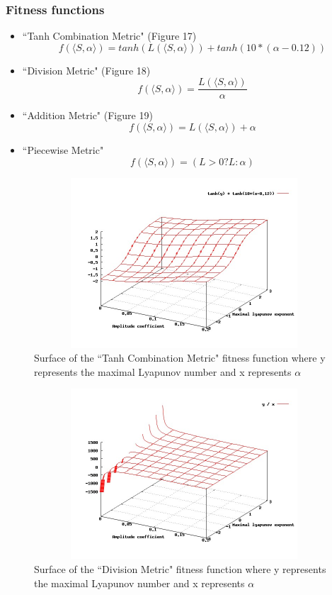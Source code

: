 \documentclass[12pt]{article}
\begin{document}
\subsubsection{Fitness functions}
\begin{itemize}
\item ``Tanh Combination Metric" (Figure 17) $$f(\langle S,\alpha \rangle) = tanh( L( \langle S, \alpha \rangle ) ) + tanh( 10*(\alpha - 0.12) )$$
\item ``Division Metric" (Figure 18) $$f(\langle S, \alpha \rangle) = \frac{L( \langle S, \alpha \rangle )}{\alpha}$$
\item ``Addition Metric" (Figure 19) $$f(\langle S, \alpha \rangle) = L( \langle S, \alpha \rangle ) + \alpha$$
\item ``Piecewise Metric" $$f( \langle S, \alpha \rangle ) = (L>0? L : \alpha)$$
\end{itemize}
\begin{figure}[htb]
\begin{center}
\includegraphics[height=2.5in,width=4.5in]{images/fitness_surface3.jpg}
\caption{ Surface of the ``Tanh Combination Metric" fitness function where y represents the maximal Lyapunov number and x represents $\alpha$}
\end{center}
\end{figure}
\begin{figure}[htb]
\begin{center}
\includegraphics[height=2.5in,width=4.5in]{images/fitness_surface2.jpg}
\caption{ Surface of the ``Division Metric" fitness function where y represents the maximal Lyapunov number and x represents $\alpha$}
\end{center}
\end{figure}
\end{document}
